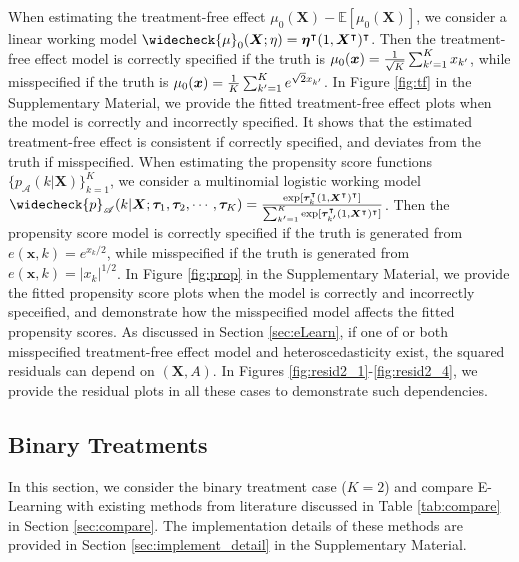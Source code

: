 \documentclass[11pt]{article}
\theoremstyle{definition}
\theoremstyle{remark}
\newcommand{\bx}{\bm{x}}
\newcommand{\bX}{\bm{X}}
\newcommand{\bmeta}{\bm{\eta}}
\newcommand{\btau}{\bm{\tau}}
\newcommand{\bbE}{\mathbb{E}}
\newcommand{\sA}{\mathscr{A}}
\begin{document}
When estimating the treatment-free effect $ \mu_{0}(\bX) - \bbE[\mu_{0}(\bX)] $, we consider a linear working model $ \widecheck{\mu}_{0}(\bX;\eta) = \bmeta^{\intercal}(1,\bX^{\intercal})^{\intercal} $. Then the treatment-free effect model is correctly specified if the truth is $ \mu_{0}(\bx) = {1 \over \sqrt{K}}\sum_{k'=1}^{K}x_{k'} $, while misspecified if the truth is $ \mu_{0}(\bx) = {1 \over K}\sum_{k'=1}^{K}e^{\sqrt{2}x_{k'}}$.  In Figure \ref{fig:tf} in the Supplementary Material, we provide the fitted treatment-free effect plots when the model is correctly and incorrectly specified. It shows that the estimated treatment-free effect is consistent if correctly specified, and deviates from the truth if misspecified. When estimating the propensity score functions $ \{p_{\sA}(k|\bX)\}_{k=1}^{K} $, we consider a multinomial logistic working model $ \widecheck{p}_{\sA}(k|\bX;\btau_{1},\btau_{2},\cdots,\btau_{K}) = {\exp[\btau_{k}^{\intercal}(1,\bX^{\intercal})^{\intercal}] \over \sum_{k'=1}^{K}\exp[\btau_{k'}^{\intercal}(1,\bX^{\intercal})^{\intercal}]} $. Then the propensity score model is correctly specified if the truth is generated from $ e(\bx,k) = e^{x_{k}/2} $, while misspecified if the truth is generated from $ e(\bx,k) = |x_{k}|^{1/2} $. In Figure \ref{fig:prop} in the Supplementary Material, we provide the fitted propensity score plots when the model is correctly and incorrectly speceified, and demonstrate how the misspecified model affects the fitted propensity scores.  As discussed in Section \ref{sec:eLearn}, if one of or both misspecified treatment-free effect model and heteroscedasticity exist, the squared residuals can depend on $ (\bX,A) $. In Figures \ref{fig:resid2_1}-\ref{fig:resid2_4}, we provide the residual plots in all these cases to demonstrate such dependencies.

\subsection{Binary Treatments}\label{sec:simulation_binary}
In this section, we consider the binary treatment case ($ K = 2 $) and compare E-Learning with existing methods from literature discussed in Table \ref{tab:compare} in Section \ref{sec:compare}. The implementation details of these methods are provided in Section \ref{sec:implement_detail} in the Supplementary Material.
\end{document}
